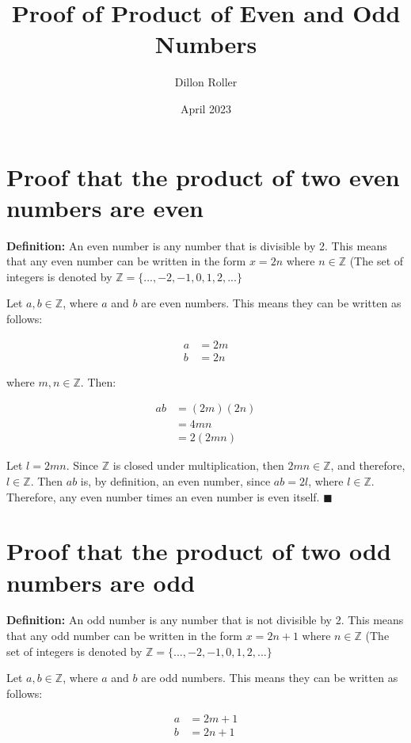\documentclass{article}
\title{Proof of Product of Even and Odd Numbers}
\author{Dillon Roller}
\date{April 2023}
\begin{document}
\maketitle

\section{Proof that the product of two even numbers are even}

\textbf{Definition:} An even number is any number that is divisible by 2. This means that any even number can be written in the form $x = 2n$ where $n \in \mathbb{Z}$ (The set of integers is denoted by $\mathbb{Z} = \{..., -2, -1, 0, 1, 2, ...\}$

Let $a,b \in \mathbb{Z}$, where $a$ and $b$ are even numbers. This means they can be written as follows:

\begin{align*}
    a &= 2m \\
    b &= 2n
\end{align*}

\noindent where $m, n \in \mathbb{Z}$. Then:

\begin{align*}
    ab &= (2m)(2n) \\
    &= 4mn \\
    &= 2(2mn)
\end{align*}

\noindent Let $l = 2mn$. Since $\mathbb{Z}$ is closed under multiplication, then $2mn \in \mathbb{Z}$, and therefore, $l \in \mathbb{Z}$. Then $ab$ is, by definition, an even number, since $ab = 2l$, where $l \in \mathbb{Z}$. Therefore, any even number times an even number is even itself. $\blacksquare$

\section{Proof that the product of two odd numbers are odd}

\textbf{Definition:} An odd number is any number that is not divisible by 2. This means that any odd number can be written in the form $x = 2n + 1$ where $n \in \mathbb{Z}$ (The set of integers is denoted by $\mathbb{Z} = \{..., -2, -1, 0, 1, 2, ...\}$

Let $a,b \in \mathbb{Z}$, where $a$ and $b$ are odd numbers. This means they can be written as follows:

\begin{align*}
    a &= 2m + 1 \\
    b &= 2n + 1
\end{align*}
\end{document}
